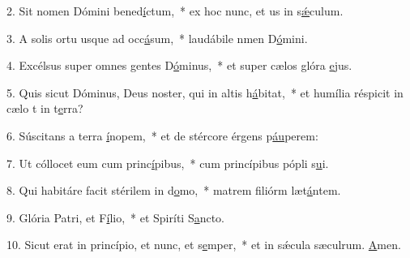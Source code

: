 2. Sit nomen Dómini bened\uline{í}ctum,~* ex hoc nunc, et us in s\uline{ǽ}culum.\par 
3. A solis ortu usque ad occ\uline{á}sum,~* laudábile nmen D\uline{ó}mini.\par 
4. Excélsus super omnes gentes D\uline{ó}minus,~* et super cælos glóra \uline{e}jus.\par 
5. Quis sicut Dóminus, Deus noster, qui in altis h\uline{á}bitat,~* et humília réspicit in cælo t in t\uline{e}rra?\par 
6. Súscitans a terra \uline{í}nopem,~* et de stércore érgens p\uline{áu}perem:\par 
7. Ut cóllocet eum cum princ\uline{í}pibus,~* cum princípibus pópli s\uline{u}i.\par 
8. Qui habitáre facit stérilem in d\uline{o}mo,~* matrem filiórm læt\uline{á}ntem.\par 
9. Glória Patri, et F\uline{í}lio,~* et Spiríti S\uline{a}ncto.\par 
10. Sicut erat in princípio, et nunc, et s\uline{e}mper,~* et in sǽcula sæculrum. \uline{A}men.\par 
